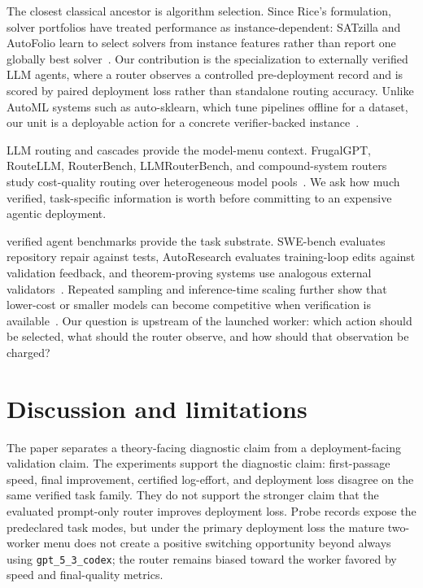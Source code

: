 \documentclass{article}
\newcounter{algorithm}
\begin{document}
The closest classical ancestor is algorithm selection.
Since Rice's formulation, solver portfolios have treated performance as instance-dependent: SATzilla and AutoFolio learn to select solvers from instance features rather than report one globally best solver~\citep{rice1976algorithm,xu2012satzilla,lindauer2015autofolio,kotthoff2016algorithm}.
Our contribution is the specialization to externally verified LLM agents, where a router observes a controlled pre-deployment record and is scored by paired deployment loss rather than standalone routing accuracy.
Unlike AutoML systems such as auto-sklearn, which tune pipelines offline for a dataset, our unit is a deployable action for a concrete verifier-backed instance~\citep{feurer2015autosklearn}.

LLM routing and cascades provide the model-menu context.
FrugalGPT, RouteLLM, RouterBench, LLMRouterBench, and compound-system routers study cost-quality routing over heterogeneous model pools~\citep{chen2023frugalgpt,ong2024routellm,hu2024routerbench,anonymous2026llmrouterbench,chen2025optimizing,yue2025masrouter,zaharia2024compound}.
We ask how much verified, task-specific information is worth before committing to an expensive agentic deployment.

verified agent benchmarks provide the task substrate.
SWE-bench evaluates repository repair against tests, AutoResearch evaluates training-loop edits against validation feedback, and theorem-proving systems use analogous external validators~\citep{jimenez2024swebench,karpathy2026autoresearch}.
Repeated sampling and inference-time scaling further show that lower-cost or smaller models can become competitive when verification is available~\citep{brown2024monkeys,snell2025testtime,wu2025inference,osca2024}.
Our question is upstream of the launched worker: which action should be selected, what should the router observe, and how should that observation be charged?

\section{Discussion and limitations}
\label{sec:discussion}

The paper separates a theory-facing diagnostic claim from a deployment-facing validation claim.
The experiments support the diagnostic claim: first-passage speed, final improvement, certified log-effort, and deployment loss disagree on the same verified task family.
They do not support the stronger claim that the evaluated prompt-only router improves deployment loss.
Probe records expose the predeclared task modes, but under the primary deployment loss the mature two-worker menu does not create a positive switching opportunity beyond always using \texttt{gpt\_5\_3\_codex}; the router remains biased toward the worker favored by speed and final-quality metrics.
\end{document}
